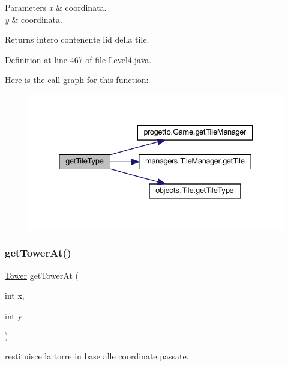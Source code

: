 \begin{DoxyParams}{Parameters}
{\em x} & coordinata. \\
\hline
{\em y} & coordinata.\\
\hline
\end{DoxyParams}
\begin{DoxyReturn}{Returns}
intero contenente l\textquotesingle{}id della tile. 
\end{DoxyReturn}


Definition at line 467 of file Level4.\+java.

Here is the call graph for this function\+:
\nopagebreak
\begin{figure}[H]
\begin{center}
\leavevmode
\includegraphics[width=332pt]{classscenes_1_1_level4_ac689e72523c8460ac3160526d310b1b7_cgraph}
\end{center}
\end{figure}
\mbox{\label{classscenes_1_1_level4_a4345f2e80059788e5ab1dd1cf0ff2c04}} 
\subsubsection{\texorpdfstring{get\+Tower\+At()}{getTowerAt()}}
{\footnotesize\ttfamily \hyperlink{classtowers_1_1_tower}{Tower} get\+Tower\+At (\begin{DoxyParamCaption}\item[{int}]{x,  }\item[{int}]{y }\end{DoxyParamCaption})\hspace{0.3cm}{\ttfamily [private]}}



restituisce la torre in base alle coordinate passate. 


